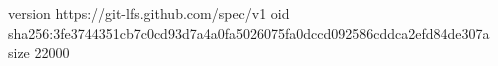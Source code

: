 version https://git-lfs.github.com/spec/v1
oid sha256:3fe3744351cb7c0cd93d7a4a0fa5026075fa0dccd092586cddca2efd84de307a
size 22000
